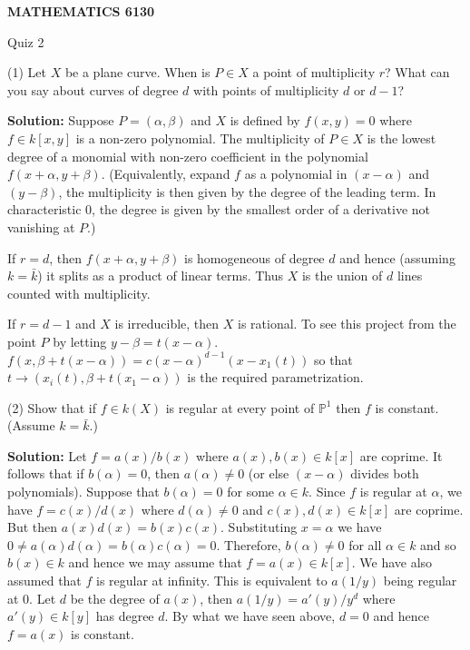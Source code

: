 \documentclass[12pt]{amsart}
\begin{document}
\bigskip\bigskip\bigskip\bigskip
\centerline{\bf MATHEMATICS 6130}
\centerline{Quiz 2}

(1) Let $X$ be a plane curve. When is $P\in X$ a point of multiplicity $r$?
What can you say about curves of degree $d$ with points of multiplicity $d$ or $d-1$? 

{\bf Solution:} Suppose $P=(\alpha , \beta )$ and $X$ is defined by $f(x,y)=0$ where $f\in k[x,y]$ is a non-zero polynomial. The multiplicity of $P\in X$ is the lowest degree of a monomial with non-zero coefficient in the polynomial $f(x+\alpha , y+\beta )$. (Equivalently, expand $f$ as a polynomial in $(x-\alpha ) $ and $(y-\beta )$, the multiplicity is then
given by the degree of the leading term. In characteristic $0$,
the degree is given by the smallest order of a derivative not vanishing  at $P$.)

If $r=d$, then $f(x+\alpha , y+\beta )$ is homogeneous of degree $d$ and hence (assuming $k=\bar k$) it splits as a product of linear terms. Thus $X$ is the union of $d$ lines counted with multiplicity.

If $r=d-1$ and $X$ is irreducible, then $X$ is rational. To see this project from the point $P$ by letting $y-\beta =t(x-\alpha)$. $f(x, \beta +t(x-\alpha))=c(x-\alpha )^{d-1}(x-x_1(t))$ so that $t\to (x_i(t), \beta +t(x_1-\alpha))$ is the required parametrization.

(2) Show that if $f\in k(X)$ is regular at every point of $\mathbb P ^1$ then $f$ is constant. (Assume $k=\bar k$.)

{\bf Solution:} Let $f=a(x)/b(x)$ where $a(x),b(x)\in k[x]$ are coprime. It follows that if $b(\alpha )=0$, then $a(\alpha )\ne 0$ (or else $(x-\alpha)$ divides both polynomials). Suppose that $b(\alpha )=0$ for some $\alpha \in k$. Since $f$ is regular at $\alpha$, we have $f=c(x)/d(x)$ where $d(\alpha )\ne 0$ and $c(x),d(x)\in k[x]$ are coprime. But then $a(x)d(x)=b(x)c(x)$. Substituting $x=\alpha$ we have $0\ne a(\alpha )d(\alpha )=b(\alpha )c(\alpha )=0$. Therefore, $b(\alpha )\ne 0$ for all $\alpha \in k$ and so $b(x)\in k$ and hence we may assume that $f=a(x)\in k[x]$. We have also assumed that $f$ is regular at infinity. This is equivalent to $a(1/y)$ being regular at $0$. Let $d$ be the degree of $a(x)$, then $a(1/y)=a'(y)/y^d$ where $a'(y)\in k[y]$ has degree $d$. By what we have seen above, $d=0$ and hence $f=a(x)$ is constant. 
\end{document}
